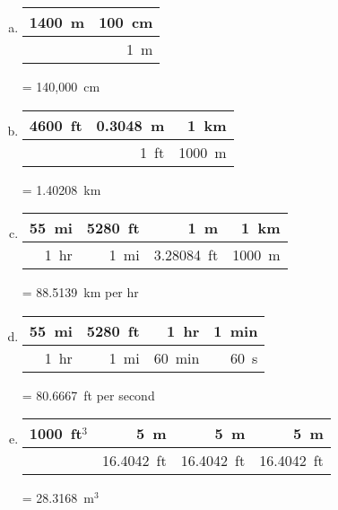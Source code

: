 \documentclass[11pt,letterpaper]{article}
\begin{document}
\sol
\begin{enumerate}[(a)]
\item \phantom{.}
	\begin{table}[!ht]
	\centering
	\begin{tabular}{r|r}
	1400~m & 100~cm \\ \hline
		      & 1~m
	\end{tabular}
	= 140,000~cm
	\end{table}

\item \phantom{.}
	\begin{table}[!ht]
	\centering
	\begin{tabular}{r|r|r}
	4600~ft & 0.3048~m & 1~km \\ \hline
		     & 1~ft 		& 1000~m
	\end{tabular}
	= 1.40208~km
	\end{table}

\item \phantom{.}
	\begin{table}[!ht]
	\centering
	\begin{tabular}{r|r|r|r}
	55~mi & 5280~ft & 1~m & 1~km \\ \hline
	1~hr & 1~mi & 3.28084~ft & 1000~m
	\end{tabular}
	= 88.5139~km per hr
	\end{table}

\item \phantom{.}
	\begin{table}[!ht]
	\centering
	\begin{tabular}{r|r|r|r}
	55~mi & 5280~ft & 1~hr      & 1~min \\ \hline
	1~hr   & 1~mi	   & 60~min & 60~s
	\end{tabular}
	= 80.6667~ft per second
	\end{table}

\item \phantom{.}
	\begin{table}[!ht]
	\centering
	\begin{tabular}{r|r|r|r}
	1000~ft$^3$ & 5~m & 5~m & 5~m \\ \hline
			    & 16.4042~ft & 16.4042~ft & 16.4042~ft
	\end{tabular}
	= 28.3168~m$^3$
	\end{table}
\end{enumerate}



\newpage
\end{document}
